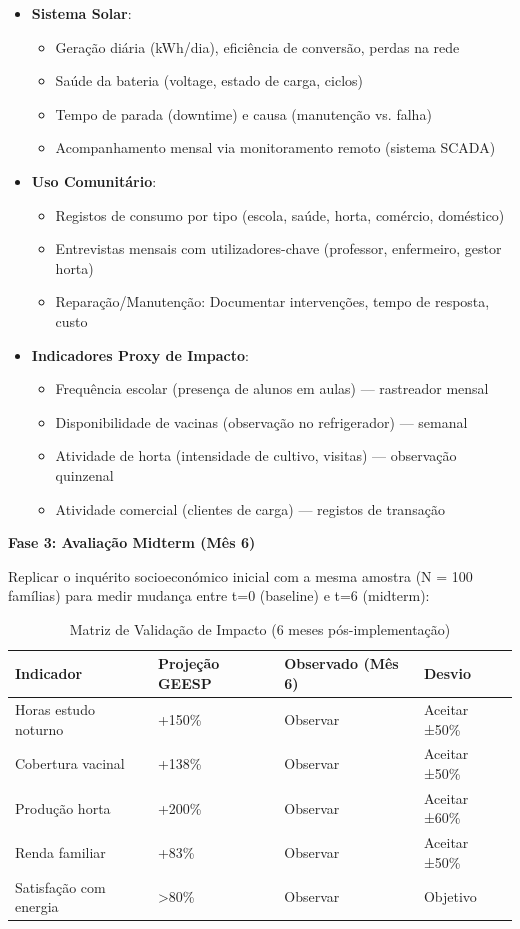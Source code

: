 \documentclass[12pt, a4paper]{article}
\begin{document}
\begin{itemize}
\item \textbf{Sistema Solar}:
  \begin{itemize}
  \item Geração diária (kWh/dia), eficiência de conversão, perdas na rede
  \item Saúde da bateria (voltage, estado de carga, ciclos)
  \item Tempo de parada (downtime) e causa (manutenção vs. falha)
  \item Acompanhamento mensal via monitoramento remoto (sistema SCADA)
  \end{itemize}

\item \textbf{Uso Comunitário}:
  \begin{itemize}
  \item Registos de consumo por tipo (escola, saúde, horta, comércio, doméstico)
  \item Entrevistas mensais com utilizadores-chave (professor, enfermeiro, gestor horta)
  \item Reparação/Manutenção: Documentar intervenções, tempo de resposta, custo
  \end{itemize}

\item \textbf{Indicadores Proxy de Impacto}:
  \begin{itemize}
  \item Frequência escolar (presença de alunos em aulas) — rastreador mensal
  \item Disponibilidade de vacinas (observação no refrigerador) — semanal
  \item Atividade de horta (intensidade de cultivo, visitas) — observação quinzenal
  \item Atividade comercial (clientes de carga) — registos de transação
  \end{itemize}
\end{itemize}

\textbf{Fase 3: Avaliação Midterm (Mês 6)}

Replicar o inquérito socioeconómico inicial com a mesma amostra (N = 100 famílias) 
para medir mudança entre t=0 (baseline) e t=6 (midterm):

\begin{table}[H]
\centering
\caption{Matriz de Validação de Impacto (6 meses pós-implementação)}
\label{tab:validation_matrix}
\footnotesize
\begin{tabular}{|l|l|l|l|}
\hline
\textbf{Indicador} & \textbf{Projeção GEESP} & \textbf{Observado (Mês 6)} & \textbf{Desvio} \\
\hline
Horas estudo noturno & +150\% & Observar & Aceitar ±50\% \\
Cobertura vacinal & +138\% & Observar & Aceitar ±50\% \\
Produção horta & +200\% & Observar & Aceitar ±60\% \\
Renda familiar & +83\% & Observar & Aceitar ±50\% \\
Satisfação com energia & >80\% & Observar & Objetivo \\
\hline
\end{tabular}
\end{table}
\end{document}
